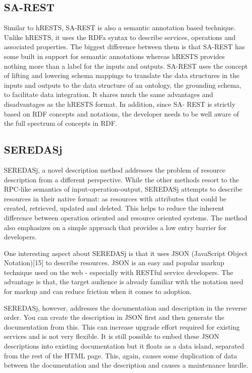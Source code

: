 \documentclass[journal]{IEEEtran}
\begin{document}
\subsection{SA-REST}

Similar to hRESTS, SA-REST\cite{gomadam2010sa} is also a semantic annotation based technique. Unlike hRESTS, it uses the RDFa syntax to describe services, operations and associated properties. The biggest difference between them is that SA-REST has some built in support for semantic annotations whereas hRESTS provides nothing more than a label for the inputs and outputs. SA-REST uses the concept of lifting and lowering schema mappings to translate the data structures in the inputs and outputs to the data structure of an ontology, the grounding schema, to facilitate data integration. It shares much the same advantages and disadvantages as the hRESTS format. In addition, since SA- REST is strictly based on RDF concepts and notations, the developer needs to be well aware of the full spectrum of concepts in RDF.

\subsection{SEREDASj} 
SEREDASj\cite{lanthaler2011semantic}, a novel description method addresses the problem of resource description from a different perspective. While the other methods resort to the RPC-like semantics of input-operation-output, SEREDASj attempts to describe resources in their native format: as resources with attributes that could be created, retrieved, updated and deleted. This helps to reduce the inherent difference between operation oriented and resource oriented systems. The method also emphasizes on a simple approach that provides a low entry  barrier for developers.

One interesting aspect about SEREDASj is that it uses JSON (JavaScript Object Notation)[15] to describe resources. JSON is an easy and popular markup technique used on the web - especially with RESTful service developers. The advantage is that, the target audience is already familiar with the notation used for markup and can reduce friction when it comes to adoption.
         
SEREDASj, however, addresses the documentation and description in the reverse order. You can create the description in JSON first and then generate the documentation from this. This can increase upgrade effort required for existing services and is not very flexible. It is still possible to embed these JSON descriptions into existing documentation but it floats as a data island, separated from the rest of the HTML page. This, again, causes some duplication of data between the documentation and the description and causes a maintenance hurdle. 
\end{document}
